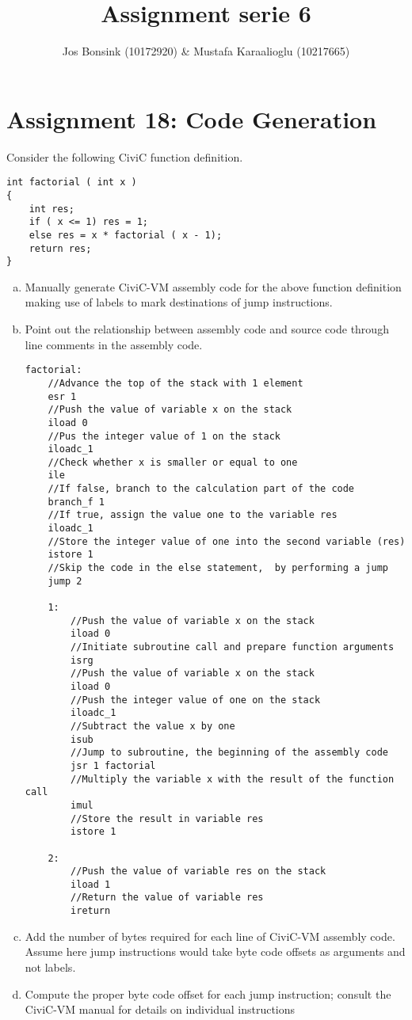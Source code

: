 \documentclass[12pt]{article}
\title{Assignment serie 6}
\author{Jos Bonsink (10172920) \& Mustafa Karaalioglu (10217665)}
\begin{document}
\maketitle

\section*{Assignment 18: Code Generation}

Consider the following CiviC function definition.

\begin{lstlisting}
int factorial ( int x )
{
	int res;
	if ( x <= 1) res = 1;
	else res = x * factorial ( x - 1);
	return res;
}
\end{lstlisting}

\begin{enumerate}[a)]
\item Manually generate CiviC-VM assembly code for the above function definition making use of labels to mark destinations of jump instructions.
\item  Point out the relationship between assembly code and source code through line comments in the assembly code.

\begin{lstlisting}
factorial:
	//Advance the top of the stack with 1 element
	esr 1
	//Push the value of variable x on the stack
	iload 0
	//Pus the integer value of 1 on the stack
	iloadc_1
	//Check whether x is smaller or equal to one
	ile
	//If false, branch to the calculation part of the code
	branch_f 1	
	//If true, assign the value one to the variable res
	iloadc_1
	//Store the integer value of one into the second variable (res)
	istore 1
	//Skip the code in the else statement,  by performing a jump
	jump 2

	1:
		//Push the value of variable x on the stack
		iload 0
		//Initiate subroutine call and prepare function arguments
		isrg
		//Push the value of variable x on the stack
		iload 0
		//Push the integer value of one on the stack
		iloadc_1
		//Subtract the value x by one
		isub
		//Jump to subroutine, the beginning of the assembly code
		jsr 1 factorial
		//Multiply the variable x with the result of the function call
		imul
		//Store the result in variable res
		istore 1

	2:
		//Push the value of variable res on the stack
		iload 1
		//Return the value of variable res
		ireturn	
\end{lstlisting}

\item  Add the number of bytes required for each line of CiviC-VM assembly code. Assume here jump instructions would take byte code offsets as arguments and not labels.
\item Compute the proper byte code offset for each jump instruction; consult the CiviC-VM manual for details on individual instructions


\end{enumerate}
\end{document}
